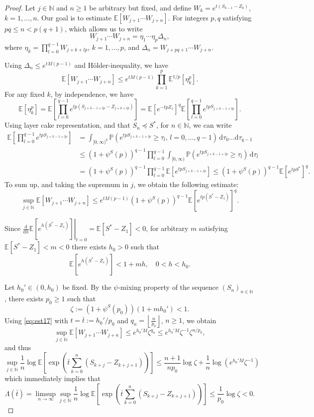\documentclass[a4paper,10pt]{article}
\newcommand{\N}{\mathbb{N}}
\renewcommand{\P}{\mathbb{P}}
\newcommand{\E}{\mathbb{E}}
\newcommand{\dint}{\mathrm{d}}  %
\newcommand{\lfrf}[1]{\left\lfloor #1\right\rfloor}
\begin{document}
\begin{proof}
	Let $j\in\N$ and $n\ge 1$ be arbitrary but fixed, and define
	$W_k = e^{t (S_{k-1}-Z_{k})}$, $k=1,\ldots,n$. Our goal is to estimate $\E [W_{j+1}\cdots W_{j+n}]$. For integers $p,q$ satisfying $pq\le n < p (q+1)$, which allows us to write
	$$
	W_{j+1}\cdots W_{j+n} =\eta_1\cdots \eta_p \Delta_n,
	$$
	where $\eta_k= \prod_{l=0}^{q-1} W_{j+k+lp}$, $k=1,\ldots, p$, and $\Delta_n=W_{j+pq+1}\cdots W_{j+n}$.
	
	Using $\Delta_n\le e^{tM (p-1)}$ and H\"older-inequality, we have
	\begin{equation}\label{eq:est16}
	\E [W_{j+1}\cdots W_{j+n}]\le e^{tM (p-1)}\prod_{k=1}^{p}\E^{1/p}[\eta_k^p].
	\end{equation}
	For any fixed $k$, by independence, we have 
	$$
	\E [\eta_k^p]=\E\left[\prod_{l=0}^{q-1}e^{tp (S_{j+k-1+lp}-Z_{j+k+lp})}\right]=\E\left[e^{-tpZ_1}\right]^q\E\left[\prod_{l=0}^{q-1}e^{tp S_{j+k-1+lp}}\right].
	$$
	Using layer cake representation, and that $S_n\preceq S^*$, for $n\in\N$, we can write
	\begin{align*}
		\E\left[\prod_{l=0}^{q-1}e^{tp S_{j+k-1+lp}}\right]
		&=
		\int_{[0,\infty)^q}\P (e^{tp S_{j+k-1+lp}}\ge \tau_l,\,l=0,\ldots,q-1)
		\,\dint \tau_0\ldots\dint \tau_{q-1}
		\\
		&\le
		 (1+\psi^S (p))^{q-1} \prod_{l=0}^{q-1}
		 \int_{[0,\infty)}\P (e^{tp S_{j+k-1+lp}}\ge \tau_l)
		 \,\dint \tau_l
		 \\
		&=
		(1+\psi^S (p))^{q-1} \prod_{l=0}^{q-1} \E\left[e^{tp S_{j+k-1+lp}}\right]\le (1+\psi^S (p))^{q-1}\E\left[e^{tp S^*}\right]^q.
	\end{align*}
	To sum up, and taking the supremum in $j$, we obtain the following estimate:
	\begin{equation}\label{eq:est17}
		\sup_{j\in\N}\E [W_{j+1}\cdots W_{j+n}]\le e^{tM (p-1)} (1+\psi^S (p))^{q-1}\E [e^{tp (S^*-Z_1)}]^q.
	\end{equation}
	
	Since $\left.\frac{\dint}{\dint h}\E\left[e^{h(S^*-Z_1)}\right]\right|_{t=0}= \E [S^*-Z_1]<0$, for arbitrary $m$ satisfying $\E [S^*-Z_1]<m<0$ there exists
	$h_0>0$ such that
	$$
	\E \left[e^{h(S^*-Z_1)}\right]<1+mh,\quad 0<h<h_0.
	$$
	
	Let $h_0'\in (0,h_0)$ be fixed. By the $\psi$-mixing property of the sequence $(S_n)_{n\in\N}$, there exists $p_0\ge 1$ such that 
	$$
	\zeta:=(1+\psi^S (p_0))(1+m h_0')<1.
	$$
	Using \eqref{eq:est17} with $t=\bar{t}:=h_0'/p_0$ and $q_n=\lfrf{\frac{n}{p_0}}$, $n\ge 1$, we obtain
	$$
	\sup_{j\in\N}\E [W_{j+1}\cdots W_{j+n}]\le e^{h_0' M}\zeta^{q_n}\le  e^{h_0' M}\zeta^{-1}\zeta^{n/p_0},
	$$
	and thus
	$$
	\sup_{j \in \mathbb{N}} 
	\frac{1}{n} \log \mathbb{E} \left[ \exp \left( \bar{t} \sum_{k=0}^n (S_{k+j} - Z_{k+j+1}) \right) \right]
	\le \frac{n+1}{n p_0}\log \zeta + \frac{1}{n}\log (e^{h_0' M}\zeta^{-1})
	$$
	which immediately implies that
	$$
	\Lambda (\bar{t})=\limsup_{n\to\infty}\sup_{j \in \mathbb{N}} 
	\frac{1}{n} \log \mathbb{E} \left[ \exp \left( \bar{t} \sum_{k=0}^n (S_{k+j} - Z_{k+j+1}) \right) \right]\le \frac{1}{p_0}\log \zeta<0.
	$$
\end{proof}
\end{document}
